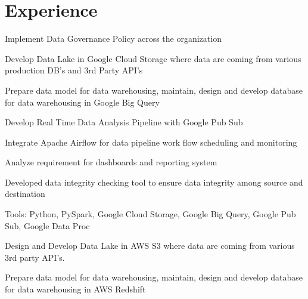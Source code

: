 \documentclass[letterpaper]{deedy-resume} %
\begin{document}
%
\begin{minipage}[t]{0.66\textwidth} %


\section{Experience}


\vspace{\topsep} %
\begin{tightitemize}
\item Implement Data Governance Policy across the organization
\item Develop Data Lake in Google Cloud Storage where data are coming from various production DB's and 3rd Party API's
\item Prepare data model for data warehousing, maintain, design and develop database for data warehousing in Google Big Query
\item Develop Real Time Data Analysis Pipeline with Google Pub Sub 
\item Integrate Apache Airflow for data pipeline work flow scheduling and monitoring
\item Analyze requirement for dashboards and reporting system
\item Developed data integrity checking tool to ensure data integrity among source and destination
\item Tools: Python, PySpark, Google Cloud Storage, Google Big Query, Google Pub Sub, Google Data Proc

\end{tightitemize}

\sectionspace %
\vspace{\topsep} %
\begin{tightitemize}
\item Design and Develop Data Lake in AWS S3 where data are coming from various 3rd party API's.
\item Prepare data model for data warehousing, maintain, design and develop database for data warehousing in AWS Redshift
\end{tightitemize}


\end{minipage}
\end{document}
